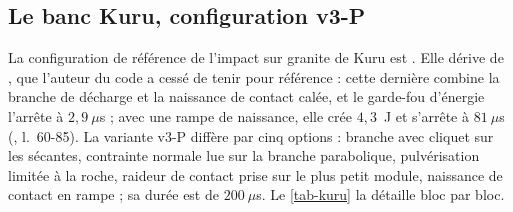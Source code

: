 \subsection{Le banc Kuru, configuration v3-P}

La configuration de référence de l'impact sur granite de Kuru est . Elle dérive de , que l'auteur du code a cessé de tenir pour référence : cette dernière combine la branche de décharge  et la naissance de contact calée, et le garde-fou d'énergie l'arrête à $2{,}9~\mu$s ; avec une rampe de naissance, elle crée $4{,}3$~J et s'arrête à $81~\mu$s (, l.~60-85). La variante v3-P diffère par cinq options : branche  avec cliquet sur les sécantes, contrainte normale lue sur la branche parabolique, pulvérisation limitée à la roche, raideur de contact prise sur le plus petit module, naissance de contact en rampe ; sa durée est de $200~\mu$s. Le \cref{tab-kuru} la détaille bloc par bloc.

